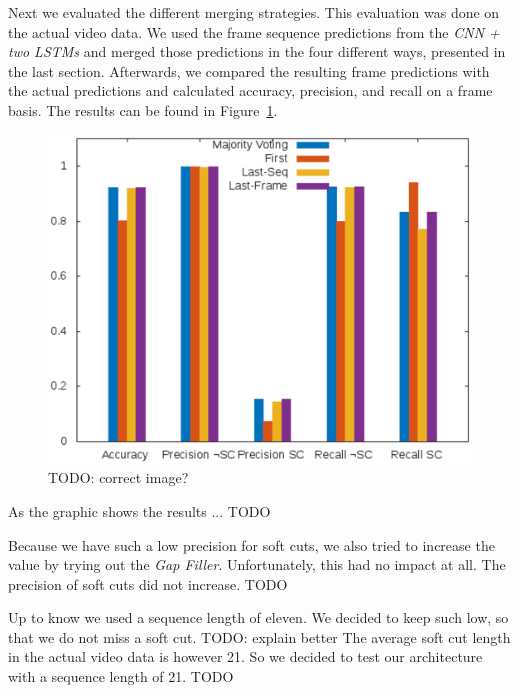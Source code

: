 Next we evaluated the different merging strategies.
This evaluation was done on the actual video data.
We used the frame sequence predictions from the \textit{CNN + two LSTMs} and merged those predictions in the four different ways, presented in the last section.
Afterwards, we compared the resulting frame predictions with the actual predictions and calculated accuracy, precision, and recall on a frame basis. %
The results can be found in Figure~\ref{fig:evaluation_net}.
\begin{figure}[!htb]
	\centering
	\includegraphics[scale=.7]{images/evalutation_net.eps}
	\caption{TODO: correct image?}
	\label{fig:evaluation_net}
\end{figure}
As the graphic shows the results ... TODO

Because we have such a low precision for soft cuts, we also tried to increase the value by trying out the \textit{Gap Filler}.
Unfortunately, this had no impact at all.
The precision of soft cuts did not increase.
TODO

Up to know we used a sequence length of eleven.
We decided to keep such low, so that we do not miss a soft cut.
TODO: explain better
The average soft cut length in the actual video data is however 21.
So we decided to test our architecture with a sequence length of 21.
TODO


